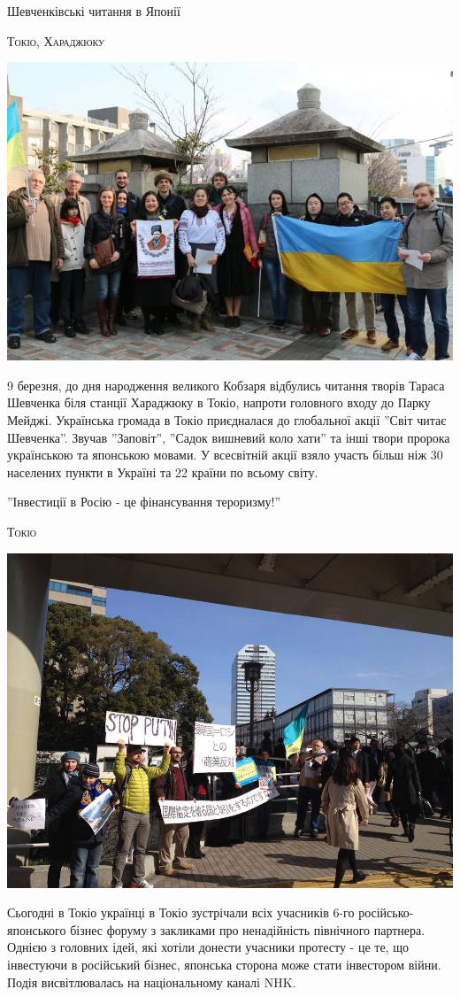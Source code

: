 \documentclass[10pt,a4paper]{article}
\newcommand{\NewsItem}[1]{%
		\usefont{T2A}{iwona}{m}{n} 
		\large #1 \vspace{4pt}
		\par \normalsize \normalfont}
\newcommand{\NewsAuthor}[1]{%
			\hfill \textsc{#1} \vspace{4pt}
			\par \normalfont}
\begin{document}
\begin{multicols}{3}
\vspace{1cm}
\NewsItem{Шевченківські читання в Японії}
\NewsAuthor{Токіо, Хараджюку}
		\begin{center}
			\includegraphics[width=0.8\linewidth]{images/shevchenko-reading}
		\end{center}
9 березня, до дня народження великого Кобзаря відбулись читання творів Тараса Шевченка біля станції Хараджюку в Токіо, напроти головного входу до Парку Мейджі. Українська громада в Токіо приєдналася до глобальної акції ''Світ читає Шевченка''. 
Звучав ''Заповіт'', ''Садок вишневий коло хати'' та інші твори пророка українською та японською мовами. 
У всесвітній акції взяло участь більш ніж 30 населених пункти в Україні та 22 країни по всьому світу.

\vspace{1cm}
\NewsItem{''Інвестиції в Росію - це фінансування тероризму!''}
\NewsAuthor{Токіо}
		\begin{center}
			\includegraphics[width=0.8\linewidth]{images/business-forum}
		\end{center}
Сьогодні в Токіо українці в Токіо зустрічали всіх учасників 6-го російсько-японського бізнес форуму з закликами про ненадійність північного партнера. Однією з головних ідей, які хотіли донести учасники протесту - це те, що інвестуючи в російський бізнес, японська сторона може стати інвестором війни.
Подія висвітлювалась на національному каналі NHK.

\end{multicols}
\end{document}
